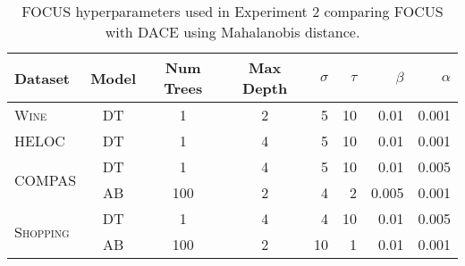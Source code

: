 \makeatletter
\setlength{\@fptop}{0pt}
\makeatother

\begin{table}[ht!]
\centering
\caption{FOCUS hyperparameters used in Experiment 2 comparing FOCUS with DACE using Mahalanobis distance.}
\label{table:hyperparameters-mahal}
\begin{tabular}{lcccrrrr}
\toprule
\textbf{Dataset}                   & \textbf{Model}       & \textbf{Num Trees}   & \textbf{Max Depth}   & $\sigma$ & $\tau$ & $\beta$ & $\alpha$ \\ \midrule
\textsc{Wine}                      & DT                   & 1                                  & 2                                  & 5  & 10 & 0.01  & 0.001       	 \\ \midrule
\textsc{HELOC}   & DT                   & 1                                  & 4                                  & 5  & 10 & 0.01  & 0.001   	    \\ \midrule

\multirow{2}{*}{\textsc{COMPAS}}   & DT                   & 1                                  & 4                                  & 5  & 10 & 0.01  & 0.005   \\
                                   & AB                   & 100                                & 2                                  & 4  & 2  & 0.005 & 0.001      	\\ \midrule
\multirow{2}{*}{\textsc{Shopping}} & DT                   & 1                                  & 4                                 & 4  & 10 & 0.01  & 0.005 \\
                                   & AB                   & 100                                & 2                                  & 10 & 1  & 0.01  & 0.001      \\ \bottomrule
\end{tabular}
\end{table}


